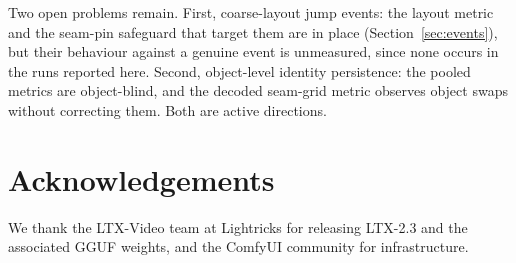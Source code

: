 \documentclass[12pt]{article}
\begin{document}
Two open problems remain.  First, coarse-layout jump events: the layout
metric and the seam-pin safeguard that target them are in place
(Section~\ref{sec:events}), but their behaviour against a genuine event is
unmeasured, since none occurs in the runs reported here.  Second,
object-level identity persistence: the pooled metrics are object-blind, and
the decoded seam-grid metric observes object swaps without correcting them.
Both are active directions.

\section*{Acknowledgements}
We thank the LTX-Video team at Lightricks for releasing LTX-2.3 and the
associated GGUF weights, and the ComfyUI community for infrastructure.
\end{document}
